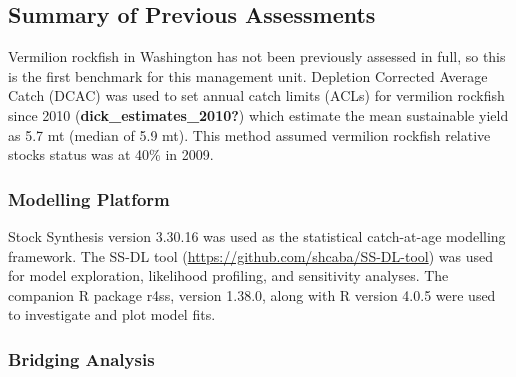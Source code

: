 \documentclass[11pt,
  english,
  a4paper,
]{article}
\begin{document}
\leavevmode\tagmcend\tagstructend


\hypertarget{summary-of-previous-assessments}{%
\subsection{Summary of Previous Assessments}\label{summary-of-previous-assessments}}

\leavevmode\tagmcend\tagstructend


Vermilion rockfish in Washington has not been previously assessed in full, so this is the first benchmark for this management unit. Depletion Corrected Average Catch (DCAC) was used to set annual catch limits (ACLs) for vermilion rockfish since 2010 {(\textbf{dick\_estimates\_2010?})\leavevmode\tagmcend\tagstructend} which estimate the mean sustainable yield as 5.7 mt (median of 5.9 mt). This method assumed vermilion rockfish relative stocks status was at 40\% in 2009.

\leavevmode\tagmcend\tagstructend\par


\hypertarget{modelling-platform}{%
\subsubsection{Modelling Platform}\label{modelling-platform}}

\leavevmode\tagmcend\tagstructend


Stock Synthesis version 3.30.16 was used as the statistical catch-at-age modelling framework. The SS-DL tool ({\url{https://github.com/shcaba/SS-DL-tool}\leavevmode\tagmcend\tagstructend}) was used for model exploration, likelihood profiling, and sensitivity analyses. The companion R package r4ss, version 1.38.0, along with R version 4.0.5 were used to investigate and plot model fits.

\leavevmode\tagmcend\tagstructend\par


\hypertarget{bridging-analysis}{%
\subsubsection{Bridging Analysis}\label{bridging-analysis}}
\end{document}
